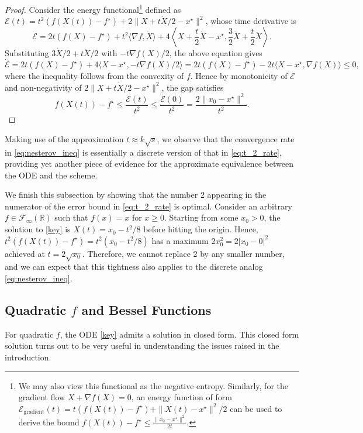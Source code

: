 \documentclass[twoside,11pt]{article}
\newcommand{\norm}[1]{\|#1\|}
\newcommand{\R}{\mathbb{R}}
\begin{document}
\begin{proof}
Consider the energy functional\footnote{We may also view this functional as the negative entropy. Similarly, for the gradient flow $\dot X + \nabla f(X) = 0$, an energy function of form $\mathcal{E}_{\mathrm{gradient}}(t) = t(f(X(t))-f^\star) + \|X(t) - x^\star\|^2/2$ can be used to derive the bound $f(X(t)) - f^\star \le \frac{\|x_0-x^\star\|^2}{2t}$.} defined as $\mathcal{E}(t) = t^2(f(X(t)) - f^\star) + 2\|X + t\dot{X}/2 - x^\star \|^2$, whose time derivative is 
\[
\dot{\mathcal{E}} = 2t(f(X) - f^\star) + t^2\langle \nabla f, \dot{X} \rangle + 4\left\langle X + \frac{t}{2}\dot{X} - x^\star, \frac{3}{2}\dot{X} + \frac{t}{2}\ddot{X} \right\rangle.
\]
Substituting $3\dot{X}/2 + t\ddot{X}/2$ with $-t\nabla f(X)/2$, the above equation gives
\[
\dot{\mathcal{E}} = 2t(f(X) - f^\star) + 4\langle X - x^\star, - t\nabla f(X)/2 \rangle  = 2t(f(X) - f^\star) -2t\langle X - x^\star, \nabla f(X) \rangle \le 0,
\]
where the inequality follows from the convexity of $f$. Hence by monotonicity of $\mathcal{E}$ and non-negativity of $2\norm{X + t\dot{X}/2 - x^\star}^2$, the gap satisfies
\begin{equation*}
f(X(t)) - f^\star \le \frac{\mathcal{E}(t)}{t^2} \le \frac{\mathcal{E}(0)}{t^2} = \frac{2\norm{x_0 - x^\star}^2}{t^2}.
\end{equation*}
\end{proof}
Making use of the approximation $t \approx k\sqrt{s}$, we observe that the convergence rate in \eqref{eq:nesterov_ineq} is essentially a discrete version of that in \eqref{eq:t_2_rate}, providing yet another piece of evidence for the approximate equivalence between the ODE and the scheme.

We finish this subsection by showing that the number 2 appearing in the numerator of the error bound in \eqref{eq:t_2_rate} is optimal. Consider an arbitrary $f \in \mathcal{F}_{\infty}(\R)$ such that $f(x) = x$ for $x \ge 0$. Starting from some $x_0 > 0$, the solution to \eqref{key} is $X(t) = x_0 - t^2/8$ before hitting the origin. Hence, $t^2(f(X(t)) - f^\star) = t^2(x_0 - t^2/8)$ has a maximum $2x_0^2 = 2|x_0 - 0|^2$ achieved at $t = 2\sqrt{x_0}$. Therefore, we cannot replace 2 by any smaller number, and we can expect that this tightness also applies to the discrete analog \eqref{eq:nesterov_ineq}.



\subsection{Quadratic $f$ and Bessel Functions}
\label{sec:bessel}
For quadratic $f$, the ODE \eqref{key} admits a solution in closed form. This closed form solution turns out to be very useful in understanding the issues raised in the introduction. 
\end{document}
